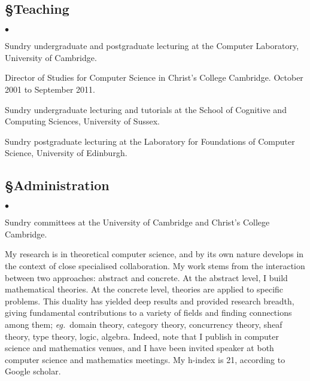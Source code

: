 \documentclass[11pt,twocolumn]{article}
\newenvironment{myitemize}
  {\begin{list}{$\bullet$}
  {\setlength{\topsep}{1pt}
   \setlength{\partopsep}{1pt}
   \setlength{\itemsep}{0pt}
   \setlength{\parsep}{0pt}
   \setlength{\leftmargin}{1em}
   \setlength{\labelwidth}{.5em}}}
  {\end{list}}
\newcommand{\eg}{\emph{eg.}}
\begin{document}
\vspace*{-0mm}
\subsection*{\S\enspace\thinspace Teaching}
\begin{myitemize}
\item Sundry undergraduate and postgraduate lecturing at the Computer
  Laboratory, University of Cambridge.  
\item Director of Studies for Computer Science in Christ's College
  Cambridge.  October 2001 to September 2011.  
\item Sundry undergraduate lecturing and tutorials at the School of
  Cognitive and Computing Sciences, University of Sussex. 
\item Sundry postgraduate lecturing at the Laboratory for Foundations of
  Computer Science, University of Edinburgh.
\end{myitemize}

\subsection*{\S\enspace\thinspace Administration}

\begin{myitemize}
\item
Sundry committees at the University of Cambridge and Christ's College
Cambridge.
\end{myitemize}

\clearpage
\setcounter{page}{1}


My research is in theoretical computer science, and by its own nature develops
in the context of close specialised collaboration.  My work stems from the
interaction between two approaches: abstract and concrete. At the abstract
level, I build mathematical theories. At the concrete level, theories are
applied to specific problems. This duality has yielded deep results and
provided research breadth, giving fundamental contributions to a variety of
fields and finding connections among them; \eg~domain theory, category theory,
concurrency theory, sheaf theory, type theory, logic, algebra.  Indeed,
note that I publish in computer science and mathematics venues, and I have
been invited speaker at both computer science and mathematics meetings.
My \mbox{h-index} is 21, according to Google scholar.  
\end{document}
